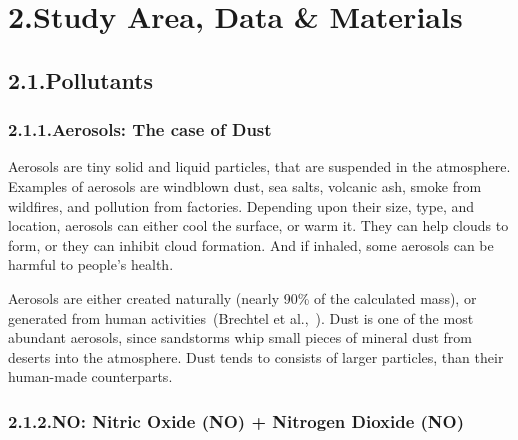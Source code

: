 \documentclass[9pt]{report}
\begin{document}
\section{2.\hspace*{0.5em}Study Area, Data \& Materials}\label{sec-study-area-data-materials}%

\subsection{2.1.\hspace*{0.5em}Pollutants}\label{sec-pollutants}%

\subsubsection{2.1.1.\hspace*{0.5em}Aerosols: The case of Dust}\label{sec-aerosols--the-case-of-dust}%

\noindent{}Aerosols  are  tiny  solid  and  liquid  particles,  that  are  suspended  in  the atmosphere. Examples  of  aerosols  are    windblown  dust,  sea salts,  volcanic ash,  smoke  from  wildfires,  and  pollution  from  factories. Depending  upon their size, type, and location, aerosols can either cool the surface, or warm it. They  can  help  clouds  to  form,  or  they  can  inhibit  cloud formation. And  if inhaled, some aerosols can be harmful to people's health.%

Aerosols  are  either  created  naturally  (nearly  90\%  of  the  calculated mass), or generated from  human activities~(Brechtel et al.,~). Dust is one of  the  most  abundant  aerosols,  since   sandstorms  whip small  pieces  of mineral  dust  from  deserts  into  the  atmosphere. Dust  tends  to  consists  of larger  particles, than  their  human-made  counterparts.%

\subsubsection{2.1.2.\hspace*{0.5em}NO: Nitric Oxide (NO) + Nitrogen Dioxide (NO)}\label{sec-nox--nitric-oxide-no-nitrogen-dioxide-no2}%
\end{document}
